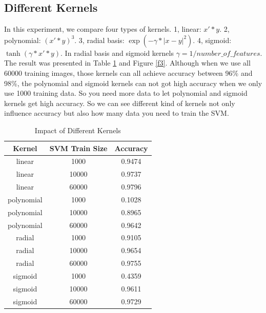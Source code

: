 \documentclass[10pt,twocolumn,letterpaper]{article}
\begin{document}
\subsection{Different Kernels}
In this experiment, we compare four types of kernels. 1, linear: $x' * y$. 2, polynomial: $ ( x' * y ) ^ 3 $. 3, radial basis: $\exp(-\gamma * |x-y| ^2)$. 4, sigmoid: $\tanh(\gamma * x' * y)$. In radial basis and sigmoid kernels $\gamma = 1/number\_of\_features$. The result was presented in Table \ref{t4} and Figure \ref{f3}. Although when we use all 60000 training images, those kernels can all achieve accuracy between 96\% and 98\%, the polynomial and sigmoid kernels can not got high accuracy when we only use 1000 training data. So you need more data to let polynomial and sigmoid kernels get high accuracy. So we can see different kind of kernels not only influence accuracy but also how many data you need to train the SVM. 

 
\begin{table}
    \begin{center}
    \begin{tabular}{|c|c|c|}
      \hline
      Kernel & SVM Train Size & Accuracy \\
      \hline
      linear & 1000 & 0.9474 \\
      linear & 10000 & 0.9737 \\
      linear & 60000 & 0.9796 \\
      \hline
      polynomial & 1000 & 0.1028 \\
      polynomial & 10000 & 0.8965 \\
      polynomial & 60000 & 0.9642\\
      \hline
      radial & 1000 & 0.9105 \\
      radial & 10000 & 0.9654 \\
      radial & 60000 & 0.9755 \\
      \hline
      sigmoid & 1000 & 0.4359 \\
      sigmoid & 10000 & 0.9611 \\
      sigmoid & 60000 & 0.9729 \\
      \hline
    \end{tabular}
    \end{center}
    
    \caption{Impact of Different Kernels}
    \label{t4}
\end{table}
\end{document}
